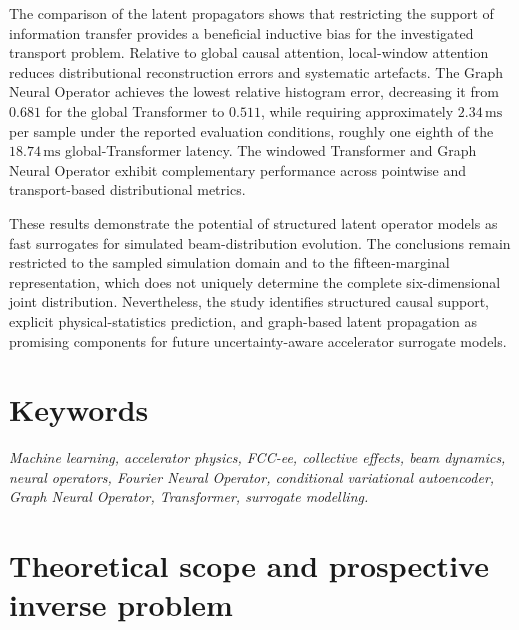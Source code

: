 \documentclass[11pt,a4paper]{article}
\begin{document}
\begin{sloppypar}
The comparison of the latent propagators shows that restricting the support of information transfer provides a beneficial inductive bias for the investigated transport problem. Relative to global causal attention, local-window attention reduces distributional reconstruction errors and systematic artefacts. The Graph Neural Operator achieves the lowest relative histogram error, decreasing it from \(0.681\) for the global Transformer to \(0.511\), while requiring approximately \(2.34\,\mathrm{ms}\) per sample under the reported evaluation conditions, roughly one eighth of the \(18.74\,\mathrm{ms}\) global-Transformer latency. The windowed Transformer and Graph Neural Operator exhibit complementary performance across pointwise and transport-based distributional metrics.

These results demonstrate the potential of structured latent operator models as fast surrogates for simulated beam-distribution evolution. The conclusions remain restricted to the sampled simulation domain and to the fifteen-marginal representation, which does not uniquely determine the complete six-dimensional joint distribution. Nevertheless, the study identifies structured causal support, explicit physical-statistics prediction, and graph-based latent propagation as promising components for future uncertainty-aware accelerator surrogate models.

\section*{Keywords}

\textit{Machine learning, accelerator physics, FCC-ee, collective effects, beam dynamics, neural operators, Fourier Neural Operator, conditional variational autoencoder, Graph Neural Operator, Transformer, surrogate modelling.}

\clearpage
{}
\pagestyle{plain}









\clearpage
\nocite{*}
\printbibliography[heading=bibintoc,title={References}]

\clearpage
\appendix

\section{Theoretical scope and prospective inverse problem}
\label{app:theoretical_scope}





\end{sloppypar}
\end{document}
